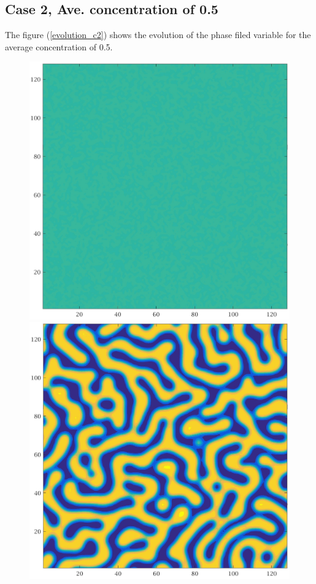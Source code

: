 \documentclass[a4paper,6pt]{article}
\begin{document}
\subsection{Case 2, Ave. concentration of 0.5}

The figure (\ref{evolution_c2}) shows the evolution of the phase filed variable for the average concentration of 0.5.

\begin{figure}[H]
        \begin{minipage}[b]{.32\linewidth}        
                \centering
                \includegraphics[width=1\textwidth]{pics/C2_t1.jpg}
        \end{minipage}
        \begin{minipage}[b]{.32\linewidth}
                \centering
                \includegraphics[width=1\textwidth]{pics/C2_t2.jpg}

\end{minipage}
\end{figure}
\end{document}

